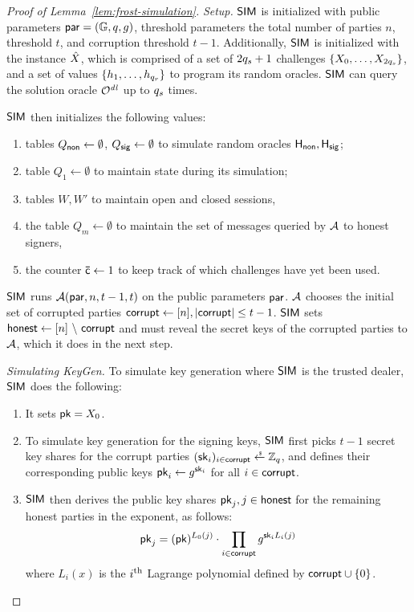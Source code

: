 \begin{proof}[Proof of Lemma~\ref{lem:frost-simulation}]
  \medskip

  \noindent\textit{Setup.}
  $\mathsf{SIM}$ is initialized with public parameters $\mathsf{par} = (\mathbb{G}, q, g)$,
  threshold parameters the total number of parties $n$,
  threshold $t$,
  and corruption threshold $t-1$.
  Additionally,
  $\mathsf{SIM}$ is initialized with the instance $\hat{X}$,
  which is comprised of
  a set  of $2q_s+1$ \AOMDL challenges $\{ X_0, \ldots, X_{2q_s}\}$,
  and a set of values
  $\{h_1, \ldots, h_{q_r} \}$ to program its random oracles.
  $\mathsf{SIM}$ can query the \AOMDL solution oracle $\mathcal{O}^{\mathit{dl}}$ up to $q_s$ times.

  \medskip

  $\mathsf{SIM}$ then initializes the following values:
  \begin{enumerate}
    \item tables $Q_{\mathsf{non}} \gets \emptyset$, $Q_{\mathsf{sig}} \gets \emptyset$ to simulate random oracles $\mathsf{H_{non}}, \mathsf{H_{sig}}$;
    \item table $Q_1 \gets \emptyset$ to maintain state during its simulation;
    \item tables $W, W'$ to maintain open and closed sessions,
    \item the table $Q_m \gets \emptyset$ to maintain the set of messages
queried by $\mathcal{A}$ to honest signers,
    \item the counter $\mathsf{\bar{c}} \gets 1$ to keep track of which \AOMDL challenges have yet been used.
  \end{enumerate}

  $\mathsf{SIM}$ runs $\mathcal{A}(\mathsf{par}, n, t-1, t)$ on the public parameters $\mathsf{par}$.
  $\mathcal{A}$ chooses the initial set of corrupted parties $\mathsf{corrupt} \gets [n], \lvert \mathsf{corrupt} \rvert \leq t-1$.
  $\mathsf{SIM}$ sets $\mathsf{honest} \gets [n]~\backslash~\mathsf{corrupt}$ and must reveal the secret keys of the corrupted parties to $\mathcal{A}$,
  which it does in the next step.

  \medskip

  \noindent\textit{Simulating KeyGen.}
    To simulate key generation where $\mathsf{SIM}$ is the trusted dealer,
    $\mathsf{SIM}$ does the following:
    \begin{enumerate}
    \item It sets $\mathsf{pk} = X_0$.
    \item To simulate key generation for the signing keys,
    $\mathsf{SIM}$ first picks $t-1$ secret key shares for the corrupt parties
        $(\sk_i)_{i \in \corrupt} \rgets \Zq$,
    and defines their corresponding public keys
        $\mathsf{pk}_i \gets g^{\mathsf{sk}_i}$ for all $i \in \mathsf{corrupt}$.
    \item $\mathsf{SIM}$ then derives the public key shares
      $\mathsf{pk}_j, j \in \mathsf{honest}$ for the remaining honest parties in the exponent, as follows:
  \begin{align} \label{eq:keygen-sim}
    \mathsf{pk}_j = (\mathsf{pk})^{L_0(j)} \cdot \prod_{i \in \mathsf{corrupt}} g^{\mathsf{sk}_i L_i(j)}
	\end{align}
        where $L_i(x)$ is the $i^{\textrm{\scriptsize th}}$ Lagrange polynomial defined by $\mathsf{corrupt} \cup \{0\}$.
    \end{enumerate}



\end{proof}
